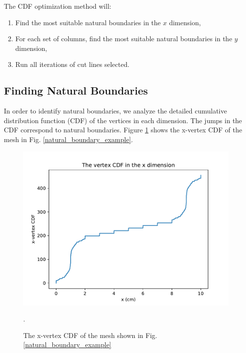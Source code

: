 The CDF optimization method will:
\begin{enumerate}
  \item Find the most suitable natural boundaries in the $x$ dimension,
  \item For each set of columns, find the most suitable natural boundaries in the $y$ dimension,
  \item Run all iterations of cut lines selected.
\end{enumerate}

\subsection{Finding Natural Boundaries}

In order to identify natural boundaries, we analyze the detailed cumulative distribution function (CDF) of the vertices in each dimension. The jumps in the CDF correspond to natural boundaries. Figure \ref{vert_cdf} shows the x-vertex CDF of the mesh in Fig. \ref{natural_boundary_example}.
\begin{figure}[h]
\centering
\includegraphics[scale=0.75]{../figures/xvertexcdf.pdf}
\caption{The x-vertex CDF of the mesh shown in Fig. \ref{natural_boundary_example}}.
\label{vert_cdf}
\end{figure}

